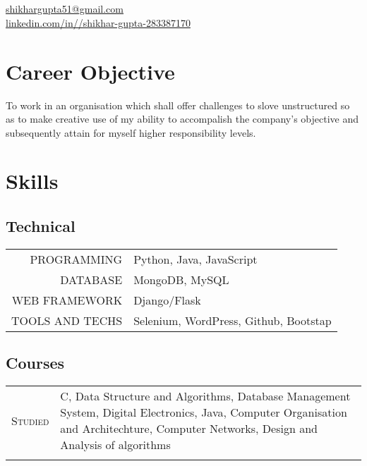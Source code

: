 \documentclass[a4paper,10pt]{article}
\begin{document}
\\
\\
\href{mailto:shikhargupta51@gmail.com}{shikhargupta51@gmail.com}\\
\href{https://www.linkedin.com/in//shikhar-gupta-283387170}{linkedin.com/in//shikhar-gupta-283387170}\\


\pagestyle{empty} 

\section{Career Objective}
{To work in an organisation which shall offer challenges to slove unstructured so as to make creative use of my ability to accompalish the company's objective and subsequently attain for myself higher responsibility levels.}

\section{Skills}
\subsection*{Technical}
\begin{tabular}{r|p{15cm}}

\textsc{PROGRAMMING}&Python, Java, JavaScript\\
\textsc{DATABASE}&MongoDB, MySQL\\
\textsc{WEB FRAMEWORK}& Django/Flask\\
\textsc{TOOLS AND TECHS}& Selenium, WordPress, Github, Bootstap\\
\end{tabular}

\subsection*{Courses}
\begin{tabular}{r|p{15cm}}
\textsc{Studied} & {C, Data Structure and Algorithms, Database Management System, Digital Electronics, Java, Computer Organisation and Architechture, Computer Networks, Design and Analysis of algorithms} \\\multicolumn{2}{c}{}\\
\end{tabular}
\end{document}
